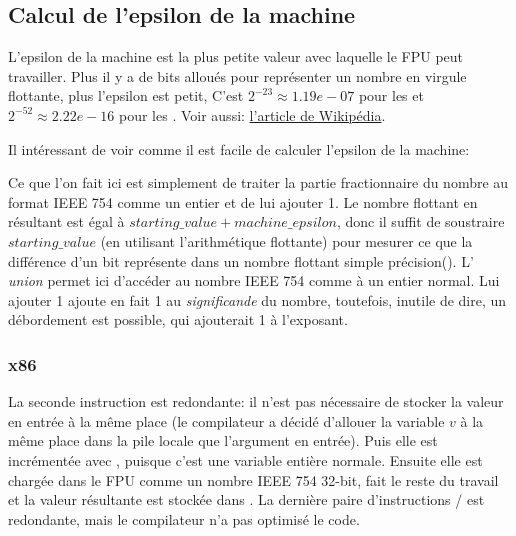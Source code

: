 ﻿\subsection{Calcul de l'epsilon de la machine}

L'epsilon de la machine est la plus petite valeur avec laquelle le \ac{FPU} peut
travailler.
Plus il y a de bits alloués pour représenter un nombre en virgule flottante, plus
l'epsilon est petit,
C'est $2^{-23} \approx 1.19e-07$ pour les \Tfloat et $2^{-52} \approx 2.22e-16$ pour les \Tdouble.
Voir aussi: \href{https://en.wikipedia.org/wiki/Arithmetic_underflow}{l'article de Wikipédia}.

Il intéressant de voir comme il est facile de calculer l'epsilon de la machine:



Ce que l'on fait ici est simplement de traiter la partie fractionnaire du nombre
au format IEEE 754 comme un entier et de lui ajouter 1.
Le nombre flottant en résultant est égal à $starting\_value+machine\_epsilon$, donc
il suffit de soustraire $starting\_value$ (en utilisant l'arithmétique flottante)
pour mesurer ce que la différence d'un bit représente dans un nombre flottant simple
précision(\Tfloat).
L' \emph{union} permet ici d'accéder au nombre IEEE 754 comme à un entier normal.
Lui ajouter 1 ajoute en fait 1 au \emph{significande} du nombre, toutefois, inutile
de dire, un débordement est possible, qui ajouterait 1 à l'exposant.

\subsubsection{x86}



La seconde instruction  est redondante: il n'est pas nécessaire de stocker
la valeur en entrée à la même place (le compilateur a décidé d'allouer la variable
$v$ à la même place dans la pile locale que l'argument en entrée).
Puis elle est incrémentée avec , puisque c'est une variable entière normale.
Ensuite elle est chargée dans le FPU comme un nombre IEEE 754 32-bit, 
fait le reste du travail et la valeur résultante est stockée dans .
La dernière paire d'instructions / est redondante, mais le compilateur
n'a pas optimisé le code.

